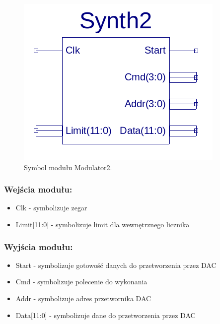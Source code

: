 \documentclass[a4paper,11pt]{article}
\begin{document}
\begin{figure}[H]
\center
\includegraphics[scale=0.5]{synthsymb.png}
\caption{Symbol modułu Modulator2.}
\end{figure}

\subsubsection*{Wejścia modułu:}
\begin{itemize}
\item Clk - symbolizuje zegar
\item Limit[11:0] - symbolizuje limit dla wewnętrznego licznika
\end{itemize}

\subsubsection*{Wyjścia modułu:}
\begin{itemize}
\item Start - symbolizuje gotowość danych do przetworzenia przez DAC
\item Cmd - symbolizuje polecenie do wykonania
\item Addr - symbolizuje adres przetwornika DAC
\item Data[11:0] - symbolizuje dane do przetworzenia przez DAC
\end{itemize}
\end{document}
